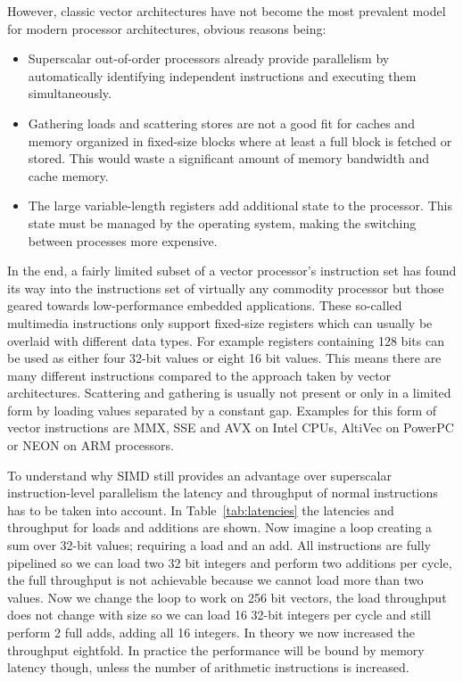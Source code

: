 However, classic vector architectures have not become the most prevalent model
for modern processor architectures, obvious reasons being:
\begin{itemize}
\item Superscalar out-of-order processors already provide parallelism by
automatically identifying independent instructions and executing them
simultaneously.
\item Gathering loads and scattering stores are not a good fit for caches and
memory organized in fixed-size blocks where at least a full block is fetched or
stored. This would waste a significant amount of memory bandwidth and cache
memory.
\item The large variable-length registers add additional state to the processor.
This state must be managed by the operating system, making the switching between
processes more expensive.
\end{itemize}

In the end, a fairly limited subset of a vector processor's instruction set has
found its way into the instructions set of virtually any commodity processor but
those geared towards low-performance embedded applications. These so-called
multimedia instructions only support fixed-size registers which can usually be
overlaid with different data types. For example registers containing 128 bits
can be used as either four 32-bit values or eight 16 bit values. This means
there are many different instructions compared to the approach taken by vector
architectures.  Scattering and gathering is usually not present or only in a
limited form by loading values separated by a constant gap.  Examples for this
form of vector instructions are MMX, SSE and AVX on Intel CPUs, AltiVec on
PowerPC or NEON on ARM processors.

To understand why SIMD still provides an advantage over superscalar
instruction-level parallelism the latency and throughput of normal instructions
has to be taken into account. In Table~\ref{tab:latencies} the latencies and
throughput for loads and additions are shown. Now imagine a loop creating a sum
over 32-bit values; requiring a load and an add. All instructions are fully
pipelined so we can load two 32 bit integers and perform two additions per
cycle, the full throughput is not achievable because we cannot load more than
two values. Now we change the loop to work on 256 bit vectors, the load
throughput does not change with size so we can load 16 32-bit integers per cycle
and still perform 2 full adds, adding all 16 integers. In theory we now
increased the throughput eightfold. In practice the performance will be bound by
memory latency though, unless the number of arithmetic instructions is
increased.

